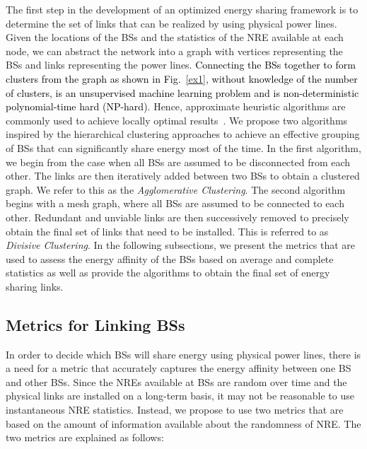 \documentclass[10pt, letter,twocolumn]{IEEEtran}
\begin{document}
The first step in the development of an optimized energy sharing framework is to determine the set of links that can be realized by using physical power lines. Given the locations of the BSs and the statistics of the NRE available at each node, we can abstract the network into a graph with vertices representing the BSs and links representing the power lines. \textcolor{black}{Connecting the BSs together to form clusters from the graph as shown in Fig.~\ref{ex1}, without knowledge of the number of clusters, is an unsupervised machine learning problem and is non-deterministic polynomial-time hard (NP-hard)}. Hence, approximate heuristic algorithms are commonly used to achieve locally optimal results~\cite{algorithms}. We propose two algorithms inspired by the hierarchical clustering approaches to achieve an effective grouping of BSs that can significantly share energy most of the time. In the first algorithm, we begin from the case when all BSs are assumed to be disconnected from each other. The links are then iteratively added between two BSs to obtain a clustered graph. We refer to this as the \emph{Agglomerative Clustering}. The second algorithm begins with a mesh graph, where all BSs are assumed to be connected to each other. Redundant and unviable links are then successively removed to precisely obtain the final set of links that need to be installed. This is referred to as \emph{Divisive Clustering}. In the following subsections, we present the metrics that are used to assess the energy affinity of the BSs based on average and complete statistics as well as provide the algorithms to obtain the final set of energy sharing links.

\vspace{-0.0cm}
\subsection{Metrics for Linking BSs}

In order to decide which BSs will share energy using physical power lines, there is a need for a metric that accurately captures the energy affinity between one BS and other BSs. Since the NREs available at BSs are random over time and the physical links are installed on a long-term basis, it may not be reasonable to use instantaneous NRE statistics. Instead, we propose to use two metrics that are based on the amount of information available about the randomness of NRE. The two metrics are explained as follows:
\end{document}
